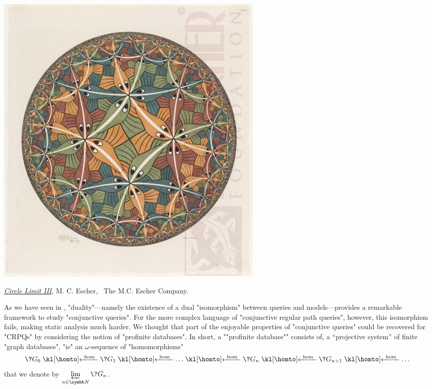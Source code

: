 \begin{marginfigure}[8em]
	\centering
	\includegraphics[width=\linewidth]{fig/escher/CL3.jpg}
	\caption{\href{https://mcescher.com/gallery/symmetry/\#iLightbox[gallery\_image_1]/12}{\emph{Circle Limit III}}, M. C. Escher, \textcopyright~The M.C. Escher Company.}
\end{marginfigure}
As we have seen in , "duality"---namely the existence of
a dual "isomorphism" between queries and models---provides a remarkable framework to
study "conjunctive queries". For the more complex language of "conjunctive regular path queries",
however, this isomorphism fails, making static analysis much harder.
We thought that part of the enjoyable properties of "conjunctive queries"
could be recovered for "CRPQs" by considering the notion of "profinite databases".
In short, a \AP""profinite database"" consists of, a ``projective system'' of finite "graph databases",
"ie" an $\omega$-sequence of "homomorphisms"
\[
	\?G_0 \cohomto \?G_1 \cohomto \dotsc \cohomto \?G_n \cohomto \?G_{n+1} \cohomto \dotsc
\]
that we denote by $\varprojlim\limits_{n\in\N} \?G_n$.

\smallskip

